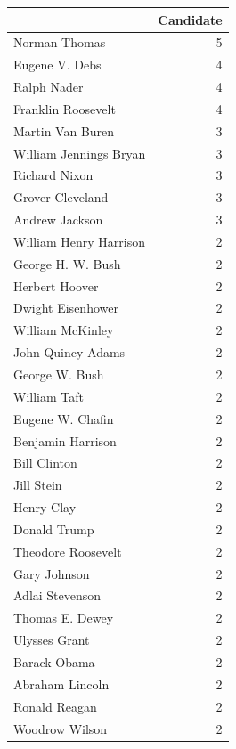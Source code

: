 \documentclass[
  letterpaper,
  DIV=11,
  numbers=noendperiod]{scrreprt}
\begin{document}
\begin{tabular}{lr}
\toprule
{} &  Candidate \\
\midrule
Norman Thomas          &          5 \\
Eugene V. Debs         &          4 \\
Ralph Nader            &          4 \\
Franklin Roosevelt     &          4 \\
Martin Van Buren       &          3 \\
William Jennings Bryan &          3 \\
Richard Nixon          &          3 \\
Grover Cleveland       &          3 \\
Andrew Jackson         &          3 \\
William Henry Harrison &          2 \\
George H. W. Bush      &          2 \\
Herbert Hoover         &          2 \\
Dwight Eisenhower      &          2 \\
William McKinley       &          2 \\
John Quincy Adams      &          2 \\
George W. Bush         &          2 \\
William Taft           &          2 \\
Eugene W. Chafin       &          2 \\
Benjamin Harrison      &          2 \\
Bill Clinton           &          2 \\
Jill Stein             &          2 \\
Henry Clay             &          2 \\
Donald Trump           &          2 \\
Theodore Roosevelt     &          2 \\
Gary Johnson           &          2 \\
Adlai Stevenson        &          2 \\
Thomas E. Dewey        &          2 \\
Ulysses Grant          &          2 \\
Barack Obama           &          2 \\
Abraham Lincoln        &          2 \\
Ronald Reagan          &          2 \\
Woodrow Wilson         &          2 \\

\end{tabular}
\end{document}
